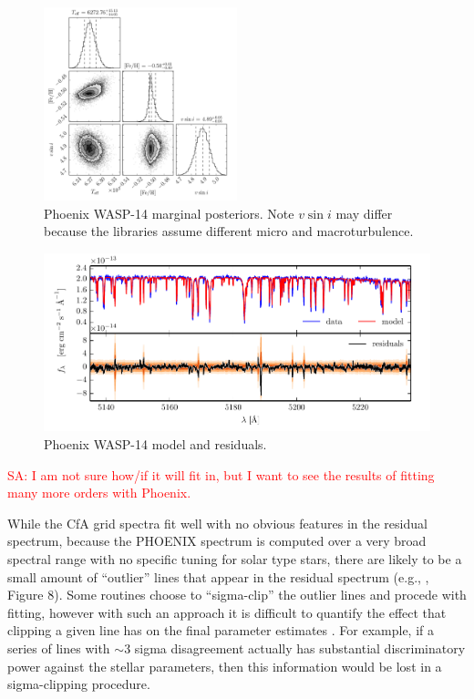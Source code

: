 \documentclass[iop,floatfix]{emulateapj}
\newcommand{\comm}[1]{ \textcolor{red}{SA: #1}}
\begin{document}
\begin{figure}[!htb]
\begin{center}
  \includegraphics[width=0.5\textwidth]{figs/PHOENIX_triangle.pdf}
\caption{ {\sc Phoenix} WASP-14 marginal posteriors. Note $v \sin i$ may differ because the libraries assume different micro and macroturbulence.}
\label{fig:PHOENIX_posterior}
\end{center}
\end{figure}

\begin{figure}[!htb]
\begin{center}
\includegraphics{figs/residuals_PHOENIX_logg.pdf}
\caption{ {\sc Phoenix} WASP-14 model and residuals.}
\label{fig:PHOENIX_residuals}
\end{center}
\end{figure}

\comm{I am not sure how/if it will fit in, but I want to see the results of fitting many more 
orders with Phoenix.}

While the CfA grid spectra fit well with no obvious features in the residual spectrum, because the PHOENIX spectrum is computed over a very broad spectral range with no specific tuning for solar type stars, there are likely to be a small amount of  ``outlier'' lines that appear in the residual spectrum (e.g., \citealt{husser13}, Figure 8). Some routines choose to ``sigma-clip'' the outlier lines and procede with fitting, however with such an approach it is difficult to quantify the effect that clipping a given line has on the final parameter estimates \citep{hogg10}. For example, if a series of lines with $\sim$3 sigma disagreement actually has substantial discriminatory power against the stellar parameters, then this information would be lost in a sigma-clipping procedure. 
\end{document}
